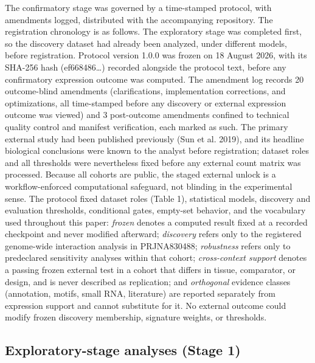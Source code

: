 \documentclass[12pt,letterpaper]{article}
\begin{document}
The confirmatory stage was governed by a time-stamped protocol, with amendments logged, distributed with the accompanying repository. The registration chronology is as follows. The exploratory stage was completed first, so the discovery dataset had already been analyzed, under different models, before registration. Protocol version 1.0.0 was frozen on 18 August 2026, with its SHA-256 hash (ef668486…) recorded alongside the protocol text, before any confirmatory expression outcome was computed. The amendment log records 20 outcome-blind amendments (clarifications, implementation corrections, and optimizations, all time-stamped before any discovery or external expression outcome was viewed) and 3 post-outcome amendments confined to technical quality control and manifest verification, each marked as such. The primary external study had been published previously (Sun et al. 2019), and its headline biological conclusions were known to the analyst before registration; dataset roles and all thresholds were nevertheless fixed before any external count matrix was processed. Because all cohorts are public, the staged external unlock is a workflow-enforced computational safeguard, not blinding in the experimental sense. The protocol fixed dataset roles (Table 1), statistical models, discovery and evaluation thresholds, conditional gates, empty-set behavior, and the vocabulary used throughout this paper: \textit{frozen} denotes a computed result fixed at a recorded checkpoint and never modified afterward; \textit{discovery} refers only to the registered genome-wide interaction analysis in PRJNA830488; \textit{robustness} refers only to predeclared sensitivity analyses within that cohort; \textit{cross-context support} denotes a passing frozen external test in a cohort that differs in tissue, comparator, or design, and is never described as replication; and \textit{orthogonal} evidence classes (annotation, motifs, small RNA, literature) are reported separately from expression support and cannot substitute for it. No external outcome could modify frozen discovery membership, signature weights, or thresholds.

\subsection*{Exploratory-stage analyses (Stage 1)}
\end{document}
